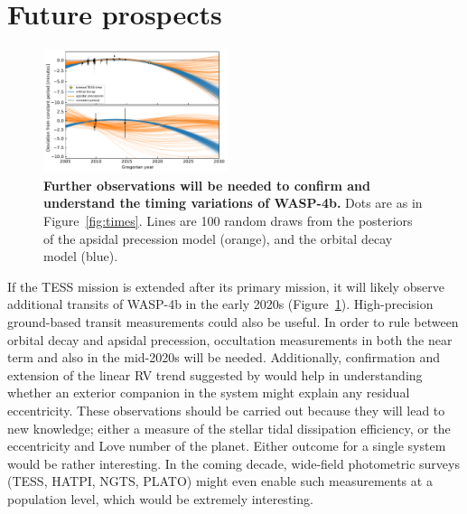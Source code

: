 \documentclass[12pt,twocolumn,tighten]{aastex62}
\begin{document}
\section{Future prospects}
\label{sec:future}

\begin{figure}[!t]
	\begin{center}
		\leavevmode
		\includegraphics[width=0.48\textwidth]{f6.pdf}
	\end{center}
  \vspace{-0.5cm}
	\caption{
		{\bf Further observations will be needed to
	    confirm and understand the timing variations of WASP-4b.}
		Dots are as in Figure~\ref{fig:times}.
		Lines are 100 random draws from the posteriors of the apsidal
		precession model (orange), and the orbital decay model (blue).    
		\label{fig:future}
	}
\end{figure}

If the TESS mission is extended after its primary mission, it will
likely observe additional transits of WASP-4b in the early 2020s
(Figure~\ref{fig:future}).  High-precision ground-based transit
measurements could also be useful.  In order to rule between orbital
decay and apsidal precession, occultation measurements in both the
near term and also in the mid-2020s will be needed.  Additionally,
confirmation and extension of the linear RV trend suggested by
\citet{knutson_friends_2014} would help in understanding whether an
exterior companion in the system might explain any residual
eccentricity.  These observations should be carried out because they
will lead to new knowledge; either a measure of the stellar tidal
dissipation efficiency, or the eccentricity and Love number of the
planet.  Either outcome for a single system would be rather
interesting.  In the coming decade, wide-field photometric surveys
(TESS, HATPI, NGTS, PLATO) might even enable such measurements at a
population level, which would be extremely interesting.
\end{document}
